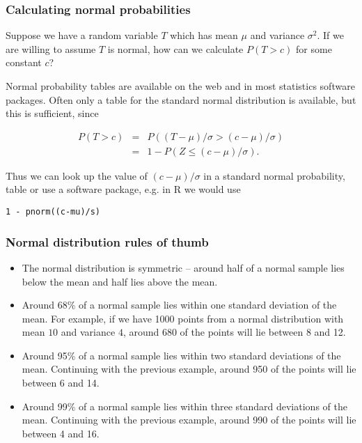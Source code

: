 \begin{frame}[fragile]
\frametitle{Calculating normal probabilities}

Suppose we have a random variable $T$ which has mean $\mu$ and
variance $\sigma^2$.  If we are willing to assume $T$ is normal, how
can we calculate $P(T>c)$ for some constant $c$?

Normal probability tables are available on the web and in most
statistics software packages.  Often only a table for the standard
normal distribution is available, but this is sufficient, since

\vspace{-0.5cm}

\begin{eqnarray*}
P(T>c) &=& P((T-\mu)/\sigma > (c-\mu)/\sigma)\\ &=& 1 - P(Z \le
(c-\mu)/\sigma).
\end{eqnarray*}

Thus we can look up the value of $(c-\mu)/\sigma$ in a standard normal
probability, table or use a software package, e.g. in R we would use

\begin{lstlisting}
1 - pnorm((c-mu)/s)
\end{lstlisting}

\end{frame}

\begin{frame}
\frametitle{Normal distribution rules of thumb}

\begin{itemize}

\item The normal distribution is symmetric -- around half of a normal
sample lies below the mean and half lies above the mean.

\item Around 68\% of a normal sample lies within one standard
deviation of the mean.  For example, if we have 1000 points from a
normal distribution with mean $10$ and variance $4$, around 680 of the
points will lie between 8 and 12.

\item Around 95\% of a normal sample lies within two standard
  deviations of the mean.  Continuing with the previous example,
  around 950 of the points will lie between 6 and 14.

\item Around 99\% of a normal sample lies within three standard
  deviations of the mean.  Continuing with the previous example,
  around 990 of the points will lie between 4 and 16.

\end{itemize}

\end{frame}



